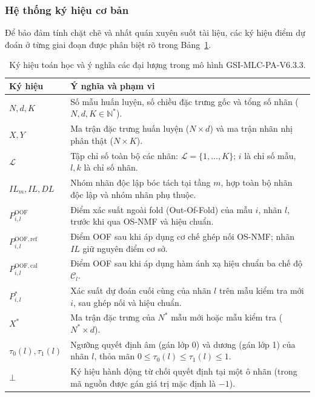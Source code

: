 \documentclass[11pt,a4paper]{article}
\begin{document}
\subsubsection{Hệ thống ký hiệu cơ bản}
Để bảo đảm tính chặt chẽ và nhất quán xuyên suốt tài liệu, các ký hiệu điểm dự đoán ở từng giai đoạn được phân biệt rõ trong Bảng~\ref{tab:notations}.

\begin{longtable}[]{@{}
  >{\raggedright\arraybackslash}p{}
  >{\raggedright\arraybackslash}p{}@{}}
\caption{Ký hiệu toán học và ý nghĩa các đại lượng trong mô hình GSI-MLC-PA-V6.3.3.} \label{tab:notations} \\
\toprule
\textbf{Ký hiệu} & \textbf{Ý nghĩa và phạm vi} \\
\midrule
\endhead
\(N, d, K\) & Số mẫu huấn luyện, số chiều đặc trưng gốc và tổng số nhãn (\(N, d, K \in \mathbb{N}^*\)). \\
\(X, Y\) & Ma trận đặc trưng huấn luyện (\(N \times d\)) và ma trận nhãn nhị phân thật (\(N \times K\)). \\
\(\mathcal{L}\) & Tập chỉ số toàn bộ các nhãn: \(\mathcal{L} = \{1, \ldots, K\}\); \(i\) là chỉ số mẫu, \(l, k\) là chỉ số nhãn. \\
\(IL_m, IL, DL\) & Nhóm nhãn độc lập bóc tách tại tầng \(m\), hợp toàn bộ nhãn độc lập và nhóm nhãn phụ thuộc. \\
\(P^{\mathrm{OOF}}_{i,l}\) & Điểm xác suất ngoài fold (Out-Of-Fold) của mẫu \(i\), nhãn \(l\), trước khi qua OS-NMF và hiệu chuẩn. \\
\(P^{\mathrm{OOF,ref}}_{i,l}\) & Điểm OOF sau khi áp dụng cơ chế ghép nối OS-NMF; nhãn \(IL\) giữ nguyên điểm cơ sở. \\
\(P^{\mathrm{OOF,cal}}_{i,l}\) & Điểm OOF sau khi áp dụng hàm ánh xạ hiệu chuẩn ba chế độ \(\mathcal{C}_l\). \\
\(P^*_{i,l}\) & Xác suất dự đoán cuối cùng của nhãn \(l\) trên mẫu kiểm tra mới \(i\), sau ghép nối và hiệu chuẩn. \\
\(X^*\) & Ma trận đặc trưng của \(N^*\) mẫu mới hoặc mẫu kiểm tra (\(N^* \times d\)). \\
\(\tau_0(l), \tau_1(l)\) & Ngưỡng quyết định âm (gán lớp 0) và dương (gán lớp 1) của nhãn \(l\), thỏa mãn \(0 \le \tau_0(l) \le \tau_1(l) \le 1\). \\
\(\bot\) & Ký hiệu hành động từ chối quyết định tại một ô nhãn (trong mã nguồn được gán giá trị mặc định là \(-1\)). \\
\bottomrule
\end{longtable}
\end{document}
